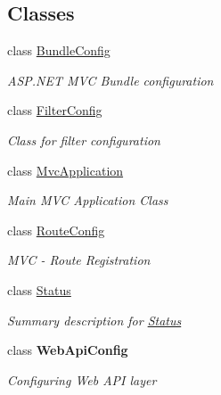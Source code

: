 \subsection*{Classes}
\begin{DoxyCompactItemize}
\item 
class \hyperlink{class_open_1_1_g_i_1_1hypermart_1_1_bundle_config}{Bundle\+Config}
\begin{DoxyCompactList}\small\item\em A\+S\+P.\+N\+E\+T M\+V\+C Bundle configuration \end{DoxyCompactList}\item 
class \hyperlink{class_open_1_1_g_i_1_1hypermart_1_1_filter_config}{Filter\+Config}
\begin{DoxyCompactList}\small\item\em Class for filter configuration \end{DoxyCompactList}\item 
class \hyperlink{class_open_1_1_g_i_1_1hypermart_1_1_mvc_application}{Mvc\+Application}
\begin{DoxyCompactList}\small\item\em Main M\+V\+C Application Class \end{DoxyCompactList}\item 
class \hyperlink{class_open_1_1_g_i_1_1hypermart_1_1_route_config}{Route\+Config}
\begin{DoxyCompactList}\small\item\em M\+V\+C -\/ Route Registration \end{DoxyCompactList}\item 
class \hyperlink{class_open_1_1_g_i_1_1hypermart_1_1_status}{Status}
\begin{DoxyCompactList}\small\item\em Summary description for \hyperlink{class_open_1_1_g_i_1_1hypermart_1_1_status}{Status} \end{DoxyCompactList}\item 
class {\bfseries Web\+Api\+Config}
\begin{DoxyCompactList}\small\item\em Configuring Web A\+P\+I layer \end{DoxyCompactList}\end{DoxyCompactItemize}
